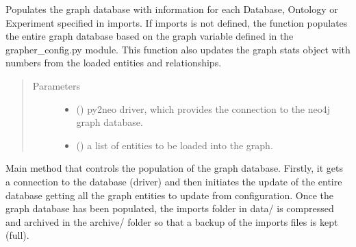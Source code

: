 \documentclass[letterpaper,10pt,english]{sphinxmanual}
\begin{document}
\begin{fulllineitems}
\label{\detokenize{_autosummary/graphdb_builder.builder:graphdb_builder.builder.loader.updateDB}}
Populates the graph database with information for each Database, Ontology or Experiment     specified in imports. If imports is not defined, the function populates the entire graph     database based on the graph variable defined in the grapher\_config.py module.     This function also updates the graph stats object with numbers from the loaded entities and     relationships.
\begin{quote}\begin{description}
\item[{Parameters}] \leavevmode\begin{itemize}
\item {} 
 () \textendash{} py2neo driver, which provides the connection to the neo4j graph database.

\item {} 
 () \textendash{} a list of entities to be loaded into the graph.

\end{itemize}

\end{description}\end{quote}

\end{fulllineitems}


\begin{fulllineitems}
\label{\detokenize{_autosummary/graphdb_builder.builder:graphdb_builder.builder.loader.fullUpdate}}
Main method that controls the population of the graph database. Firstly, it gets a connection     to the database (driver) and then initiates the update of the entire database getting     all the graph entities to update from configuration. Once the graph database has been     populated, the imports folder in data/ is compressed and archived in the archive/ folder     so that a backup of the imports files is kept (full).

\end{fulllineitems}
\end{document}
